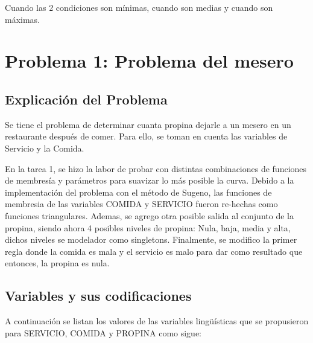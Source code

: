 \documentclass[11pt, letterpaper]{article}
\begin{document}
Cuando las 2 condiciones son mínimas, cuando son medias y cuando son máximas.

\newpage


\section{Problema 1: Problema del mesero}

\subsection{Explicación del Problema}

Se tiene el problema de determinar cuanta propina dejarle a un mesero en un restaurante después de comer. Para ello, se toman en cuenta las variables de Servicio y la Comida.

En la tarea 1, se hizo la labor de probar con distintas combinaciones de funciones de membresía y parámetros para suavizar lo más posible la curva. Debido a la implementación del problema con el método de Sugeno, las funciones de membresia de las variables COMIDA y SERVICIO fueron re-hechas como funciones triangulares. Ademas, se agrego otra posible salida al conjunto de la propina, siendo ahora 4 posibles niveles de propina: Nula, baja, media y alta, dichos niveles se modelador como singletons. Finalmente, se modifico la primer regla donde la comida es mala y el servicio es malo para dar como resultado que entonces, la propina es nula.


\subsection{Variables y sus codificaciones}

A continuación se listan los valores de las variables lingüísticas que se propusieron para SERVICIO, COMIDA y PROPINA como sigue:
\end{document}

